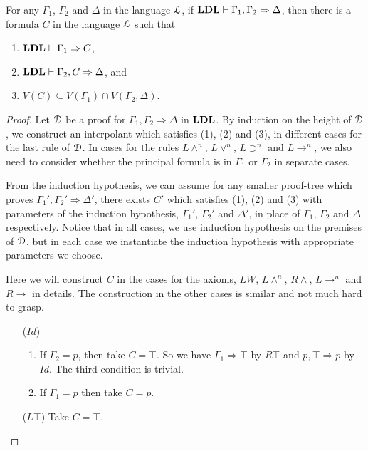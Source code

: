 \begin{thm}\label{thm:craig} For any $\Gamma_1$, $\Gamma_2$ and $\Delta$ in the language $\mathcal{L}$, if $\mathbf{LDL} \vdash \Gamma_1 , \Gamma_2 \Rightarrow \Delta$, then there is a formula $C$ in the language $\mathcal{L}$ such that
  \begin{enumerate}
    \item $\mathbf{LDL} \vdash \Gamma_1 \Rightarrow C$,
    \item $\mathbf{LDL} \vdash \Gamma_2 , C \Rightarrow \Delta$, and
    \item $V(C) \subseteq V(\Gamma_1) \cap V(\Gamma_2 , \Delta)$.
  \end{enumerate}
\end{thm}

\begin{proof}
Let $\mathcal{D}$ be a proof for $\Gamma_1 , \Gamma_2 \Rightarrow \Delta$ in $\mathbf{LDL}$. By induction on the height of $\mathcal{D}$, we construct an interpolant which satisfies (1), (2) and (3), in different cases for the last rule of $\mathcal{D}$. In cases for the rules $L \wedge ^n$, $L \vee ^n$, $L \supset ^n$ and $L \rightarrow ^n$, we also need to consider whether the principal formula is in $\Gamma_1$ or $\Gamma_2$ in separate cases.

From the induction hypothesis, we can assume for any smaller proof-tree which proves $\Gamma_1' , \Gamma_2' \Rightarrow \Delta'$, there exists $C'$ which satisfies (1), (2) and (3) with parameters of the induction hypothesis, $\Gamma_1'$, $\Gamma_2'$ and $\Delta'$, in place of $\Gamma_1$, $\Gamma_2$ and $\Delta$ respectively. Notice that in all cases, we use induction hypothesis on the premises of $\mathcal{D}$, but in each case we instantiate the induction hypothesis with appropriate parameters we choose.

Here we will construct $C$ in the cases for the axioms, $LW$, $L \wedge ^n$, $R \wedge$, $L \rightarrow ^n$ and $R \rightarrow$ in details. The construction in the other cases is similar and not much hard to grasp.


\begin{enumerate}
	\item[($Id$)]
	\begin{enumerate}
		\item If $\Gamma_2 = p$, then take $C = \top$. So we have $\Gamma_1 \Rightarrow \top$ by $R \top$ and $p , \top \Rightarrow p$ by $Id$. The third condition is trivial.
		
		\item If $\Gamma_1 = p$ then take $C = p$.
	\end{enumerate}
	\item[($L \top$)] Take $C = \top$.
	

\end{enumerate}
\end{proof}
